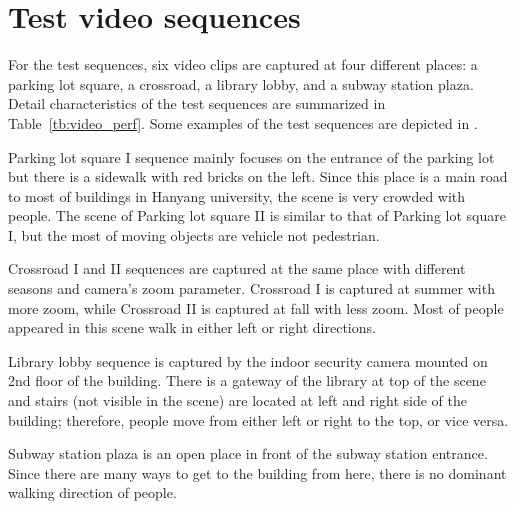 \documentclass[11pt]{hyu_thesis}
\begin{document}
\section{Test video sequences}
For the test sequences, six video clips are captured at four different places: a parking lot square, a crossroad, a library lobby, and a subway station plaza. Detail characteristics of the test sequences are summarized in Table~\ref{tb:video_perf}. Some examples of the test sequences are depicted in .

Parking lot square I sequence mainly focuses on the entrance of the parking lot but there is a sidewalk with red bricks on the left. Since this place is a main road to most of buildings in Hanyang university, the scene is very crowded with people. The scene of Parking lot square II is similar to that of Parking lot square I, but the most of moving objects are vehicle not pedestrian.

Crossroad I and II sequences are captured at the same place with different seasons and camera's zoom parameter. Crossroad I is captured at summer with more zoom, while Crossroad II is captured at fall with less zoom. Most of people appeared in this scene walk in either left or right directions.

Library lobby sequence is captured by the indoor security camera mounted on 2nd floor of the building. There is a gateway of the library at top of the scene and stairs (not visible in the scene) are located at left and right side of the building; therefore, people move from either left or right to the top, or vice versa.

Subway station plaza is an open place in front of the subway station entrance. Since there are many ways to get to the building from here, there is no dominant walking direction of people.
\end{document}
